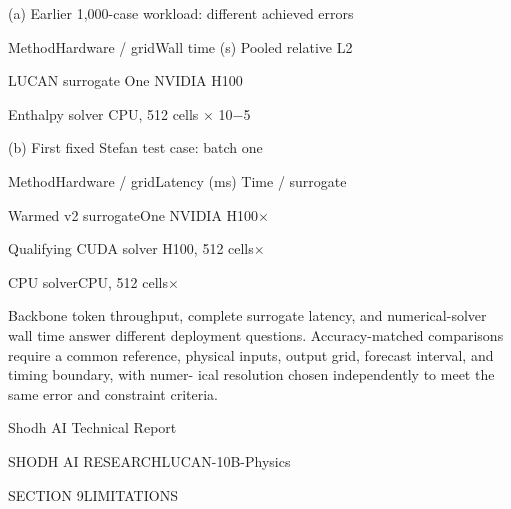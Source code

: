 \documentclass[11pt]{article}
\begin{document}
(a) Earlier 1,000-case workload: different achieved errors


\noindent Method\quad Hardware / grid\quad Wall time (s) Pooled relative L2\par


\noindent LUCAN surrogate One NVIDIA H100\par


\noindent Enthalpy solver CPU, 512 cells \ensuremath{\times} 10\ensuremath{-}5\par


(b) First fixed Stefan test case: batch one


\noindent Method\quad Hardware / grid\quad Latency (ms) Time / surrogate\par


\noindent Warmed v2 surrogate\quad One NVIDIA H100\ensuremath{\times}\par


\noindent Qualifying CUDA solver H100, 512 cells\ensuremath{\times}\par


\noindent CPU solver\quad CPU, 512 cells\ensuremath{\times}\par

Backbone token throughput, complete surrogate latency, and numerical-solver wall time
answer different deployment questions. Accuracy-matched comparisons require a common
reference, physical inputs, output grid, forecast interval, and timing boundary, with numer-
ical resolution chosen independently to meet the same error and constraint criteria.





\noindent Shodh AI Technical Report\par




\noindent SHODH AI RESEARCH\quad LUCAN-10B-Physics\par




\noindent SECTION 9\quad LIMITATIONS\par
\end{document}
